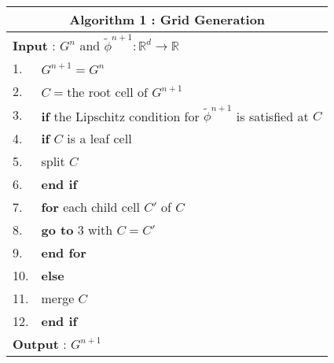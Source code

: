 \documentclass[english]{article}
\begin{document}
\begin{center}
\begin{tabular}{ll}\hline
\multicolumn{2}{c}{\textbf{Algorithm 1} : Grid Generation} \bigstrut\\\hline
\multicolumn{2}{l}{\textbf{Input} : $G^n$ and ${\tilde{\phi}}^{n+1}:\mathbb{R}^d \to \mathbb{R}$
}\bigstrut\\\hline
1. &$G^{n+1}=G^{n}$ \\
2. &$C= \text{the root cell of } G^{n+1}$ \\
3. &\textbf{if} the Lipschitz condition for  ${\tilde{\phi}}^{n+1}$ is satisfied at $C$ \\
4. &\qquad \textbf{if} $C$ is a leaf cell \\
5. &\qquad\qquad split $C$ \\
6. &\qquad \textbf{end if} \\
7. &\qquad \textbf{for} each child cell $C'$ of $C$ \\
8. &\qquad \qquad \textbf{go to} 3 with $C=C'$ \\
9. &\qquad \textbf{end for} \\
10.&\textbf{else} \\
11.&\qquad merge $C$ \\
12.& \textbf{end if} \\\hline
\multicolumn{2}{l}{\textbf{Output} : $G^{n+1}$}\bigstrut\\\hline
\end{tabular}
\end{center}

%
%
\end{document}
